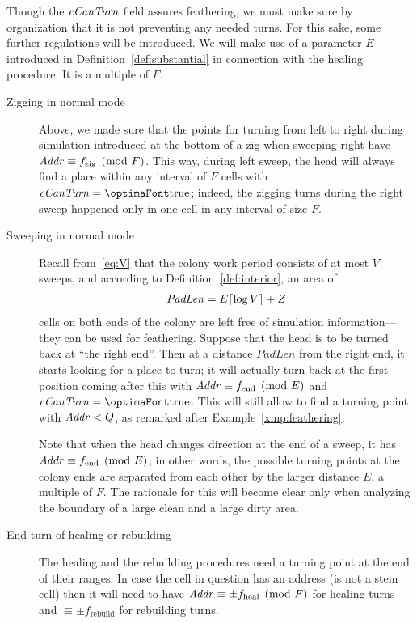 \documentclass[12pt]{memoir}
\newcommand{\fld}[1]{\ensuremath{\textit{#1\/}}}
\newcommand{\tEnd}{f_{\mathrm{end}}}
\newcommand{\tZig}{f_{\mathrm{zig}}}
\newcommand{\tHeal}{f_{\mathrm{heal}}}
\newcommand{\tRebuild}{f_{\mathrm{rebuild}}}
\newcommand{\E}{E}
\newcommand{\Q}{Q}
\renewcommand{\V}{V}
\newcommand{\F}{F}
\newcommand{\Z}{Z}
\newcommand{\Addr}{\fld{Addr}}
\newcommand{\cCanTurn}{\fld{cCanTurn}}
\newcommand{\PadLen}{\mathit{PadLen}}
\begin{document}
Though the \( \cCanTurn \) field assures feathering, we must make sure by organization
that it is not preventing any needed turns.
For this sake, some further regulations will be introduced.
We will make use of a parameter \( \E \) introduced in Definition~\ref{def:substantial}
in connection with the healing procedure.
It is a multiple of \( \F \).
\begin{description}
  \item[Zigging in normal mode]
Above, we made sure that the points for turning from left to right during simulation
introduced at the bottom of a zig when sweeping right have \( \Addr\equiv \tZig\pmod{\F} \).
This way, during left sweep, the head will always find a place within any interval of
\( \F \) cells with \( \cCanTurn=\true \); indeed, the zigging turns during the right sweep
happened only in one cell in any interval of size \( \F \).

  \item[Sweeping in normal mode]
Recall from~\eqref{eq:V} that the colony work period consists of at most \( \V \) sweeps,
and according to Definition~\ref{def:interior}, an area of
\begin{align}\label{eq:PadLenDef}
 \PadLen = \E\cei{\log\V}+\Z %
 \end{align} 
cells on both ends of the colony are left free of simulation information---they can be used for
feathering.
Suppose that the head is to be turned back at ``the right end''.
Then at a distance \( \PadLen \) from the right end, 
it starts looking for a place to turn;
it will actually turn back at the first position coming after this
with \( \Addr\equiv \tEnd \pmod{\E} \) and \( \cCanTurn=\true \).
This will still allow to find a turning point with \( \Addr<\Q \), 
as remarked after Example~\ref{xmp:feathering}.

Note that when the head changes direction at the end of a sweep,
it has \( \Addr\equiv \tEnd\pmod{\E} \); in other words, the
possible turning points at the colony ends are separated from each other by the
larger distance \( \E \), a multiple of \( \F \). 
The rationale for this will become clear only when analyzing the boundary of a large
clean and a large dirty area.

\item[End turn of healing or rebuilding]
The healing and the rebuilding procedures need a turning point
at the end of their ranges.
In case the cell in question has an address (is not a stem cell) then
it will need to have \( \Addr\equiv \pm\tHeal\pmod{\F} \) 
for healing turns and \( \equiv \pm\tRebuild \) for rebuilding turns.


\end{description}
\end{document}
